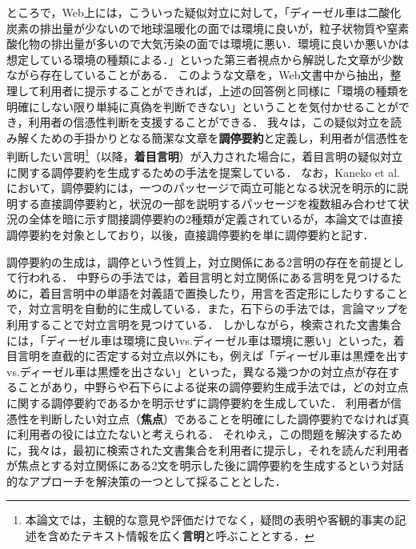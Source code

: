 \documentclass[japanese]{jnlp_1.4}
\begin{document}
ところで，Web上には，こういった疑似対立に対して，「ディーゼル車は二酸化炭素の排出量が少ないので地球温暖化の面では環境に良いが，粒子状物質や窒素酸化物の排出量が多いので大気汚染の面では環境に悪い．環境に良いか悪いかは想定している環境の種類による．」といった第三者視点から解説した文章が少数ながら存在していることがある．
このような文章を，Web文書中から抽出，整理して利用者に提示することができれば，上述の回答例と同様に「環境の種類を明確にしない限り単純に真偽を判断できない」ということを気付かせることができ，利用者の信憑性判断を支援することができる．
我々は，この疑似対立を読み解くための手掛かりとなる簡潔な文章を{\bf 調停要約}と定義し，利用者が信憑性を判断したい言明\footnote{本論文では，主観的な意見や評価だけでなく，疑問の表明や客観的事実の記述を含めたテキスト情報を広く{\bf 言明}と呼ぶこととする．}（以降，{\bf 着目言明}）が入力された場合に，着目言明の疑似対立に関する調停要約を生成するための手法を提案している\cite{Shibuki2011a,Nakano2011,Ishioroshi2011,Shibuki2010,Kaneko2009,Shibuki2011b}．
なお，Kaneko et al. \citeyear{Kaneko2009}において，調停要約には，一つのパッセージで両立可能となる状況を明示的に説明する直接調停要約と，状況の一部を説明するパッセージを複数組み合わせて状況の全体を暗に示す間接調停要約の2種類が定義されているが，本論文では直接調停要約を対象としており，以後，直接調停要約を単に調停要約と記す．

調停要約の生成は，調停という性質上，対立関係にある2言明の存在を前提として行われる．
中野らの手法\cite{Nakano2011}では，着目言明と対立関係にある言明を見つけるために，着目言明中の単語を対義語で置換したり，用言を否定形にしたりすることで，対立言明を自動的に生成している．また，石下らの手法\cite{Ishioroshi2011}では，言論マップ\cite{Murakami2010}を利用することで対立言明を見つけている．
しかしながら，検索された文書集合には，「ディーゼル車は環境に良いvs.ディーゼル車は環境に悪い」といった，着目言明を直截的に否定する対立点以外にも，例えば「ディーゼル車は黒煙を出すvs.ディーゼル車は黒煙を出さない」といった，異なる幾つかの対立点が存在することがあり，中野らや石下らによる従来の調停要約生成手法では，どの対立点に関する調停要約であるかを明示せずに調停要約を生成していた．
利用者が信憑性を判断したい対立点（{\bf 焦点}）であることを明確にした調停要約でなければ真に利用者の役には立たないと考えられる．
それゆえ，この問題を解決するために，我々は，最初に検索された文書集合を利用者に提示し，それを読んだ利用者が焦点とする対立関係にある2文を明示した後に調停要約を生成するという対話的なアプローチを解決策の一つとして採ることとした．
\end{document}
